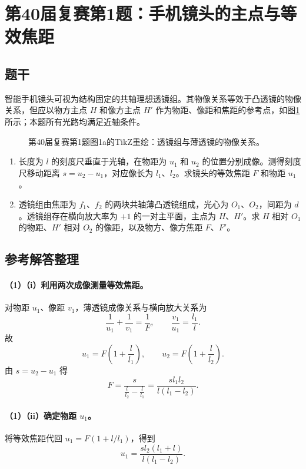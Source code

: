 \section{第40届复赛第1题：手机镜头的主点与等效焦距}

\subsection{题干}

智能手机镜头可视为结构固定的共轴理想透镜组。其物像关系等效于凸透镜的物像关系，但应以物方主点 $H$ 和像方主点 $H'$ 作为物距、像距和焦距的参考点，如图\ref{fig:cpho40q01}所示；本题所有光路均满足近轴条件。

\begin{figure}[htbp]
  \centering
  
  \caption{第40届复赛第1题图1a的TikZ重绘：透镜组与薄透镜的物像关系。}
  \label{fig:cpho40q01}
\end{figure}

\begin{enumerate}
  \item 长度为 $l$ 的刻度尺垂直于光轴，在物距为 $u_1$ 和 $u_2$ 的位置分别成像。测得刻度尺移动距离 $s=u_2-u_1$，对应像长为 $l_1$、$l_2$。求镜头的等效焦距 $F$ 和物距 $u_1$。
  \item 透镜组由焦距为 $f_1$、$f_2$ 的两块共轴薄凸透镜组成，光心为 $O_1$、$O_2$，间距为 $d$。透镜组存在横向放大率为 $+1$ 的一对主平面，主点为 $H$、$H'$。求 $H$ 相对 $O_1$ 的物距、$H'$ 相对 $O_2$ 的像距，以及物方、像方焦距 $F$、$F'$。
\end{enumerate}

\subsection{参考解答整理}

\paragraph{（1）（i）利用两次成像测量等效焦距。}
对物距 $u_1$、像距 $v_1$，薄透镜成像关系与横向放大关系为
\[
\frac1{u_1}+\frac1{v_1}=\frac1F,
\qquad \frac{v_1}{u_1}=\frac{l_1}{l}.
\]
故
\[
u_1=F\left(1+\frac{l}{l_1}\right),
\qquad
u_2=F\left(1+\frac{l}{l_2}\right).
\]
由 $s=u_2-u_1$ 得
\[
F=\frac{s}{\frac{l}{l_2}-\frac{l}{l_1}}
=\frac{sl_1l_2}{l(l_1-l_2)}.
\]

\paragraph{（1）（ii）确定物距 $u_1$。}
将等效焦距代回 $u_1=F(1+l/l_1)$，得到
\[
\boxed{u_1=\frac{sl_2(l_1+l)}{l(l_1-l_2)}}.
\]

